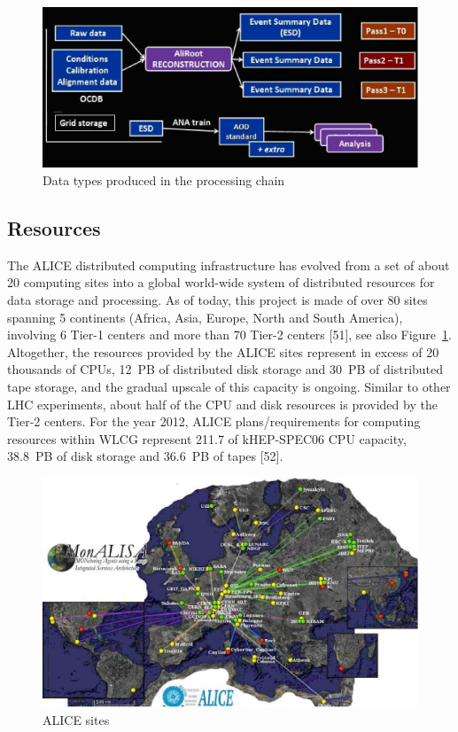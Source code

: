 \begin{figure}[htb] %
\centering
\includegraphics[width=13cm]{fig13.eps} %
\caption{Data types produced in the processing chain}\label{fig13}
\end{figure}


\subsection{Resources}
%
The ALICE distributed computing infrastructure has evolved from a
set of about 20 computing sites into a global world-wide system of
distributed resources for data storage and processing. As of today,
this project is made of over 80 sites spanning 5 continents (Africa,
Asia, Europe, North and South America), involving 6 Tier-1 centers
and more than 70 Tier-2 centers [51], see also Figure~\ref{fig13}.
Altogether, the resources provided by the ALICE sites represent in
excess of 20 thousands of CPUs, 12~PB of distributed disk storage
and 30~PB of distributed tape storage, and the gradual upscale of
this capacity is ongoing.  Similar to other LHC experiments, about
half of the CPU and disk resources is provided by the Tier-2
centers. For the year 2012, ALICE plans/requirements for computing
resources within WLCG represent 211.7 of kHEP-SPEC06 CPU capacity,
38.8~PB of disk storage and 36.6~PB of tapes [52].

\begin{figure}[htb] %
\centering
\includegraphics[width=13cm]{fig14.eps} %
\caption{ALICE sites}\label{fig14}
\end{figure}


